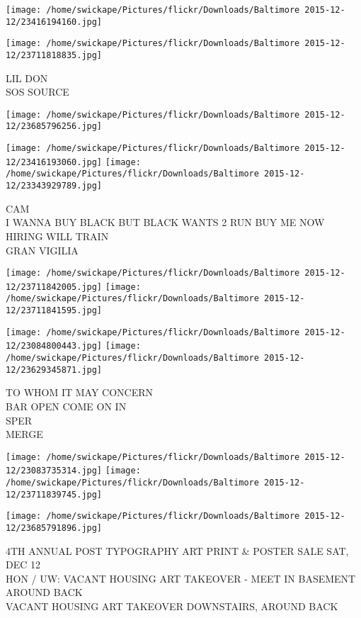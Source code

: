 \documentclass[10pt,letterpaper]{article}
\begin{document}
\texttt{[image: /home/swickape/Pictures/flickr/Downloads/Baltimore 2015-12-12/23416194160.jpg]}

\vspace{0.25in}
\texttt{[image: /home/swickape/Pictures/flickr/Downloads/Baltimore 2015-12-12/23711818835.jpg]}

LIL DON\\
SOS SOURCE
\pagebreak

\texttt{[image: /home/swickape/Pictures/flickr/Downloads/Baltimore 2015-12-12/23685796256.jpg]}

\vspace{0.25in}
\texttt{[image: /home/swickape/Pictures/flickr/Downloads/Baltimore 2015-12-12/23416193060.jpg]}
\texttt{[image: /home/swickape/Pictures/flickr/Downloads/Baltimore 2015-12-12/23343929789.jpg]}

CAM\\
I WANNA BUY BLACK BUT BLACK WANTS 2 RUN BUY ME NOW HIRING WILL TRAIN\\
GRAN VIGILIA
\pagebreak

\texttt{[image: /home/swickape/Pictures/flickr/Downloads/Baltimore 2015-12-12/23711842005.jpg]}
\texttt{[image: /home/swickape/Pictures/flickr/Downloads/Baltimore 2015-12-12/23711841595.jpg]}

\texttt{[image: /home/swickape/Pictures/flickr/Downloads/Baltimore 2015-12-12/23084800443.jpg]}
\texttt{[image: /home/swickape/Pictures/flickr/Downloads/Baltimore 2015-12-12/23629345871.jpg]}

TO WHOM IT MAY CONCERN\\
BAR OPEN COME ON IN\\
SPER\\
MERGE
\pagebreak

\texttt{[image: /home/swickape/Pictures/flickr/Downloads/Baltimore 2015-12-12/23083735314.jpg]}
\texttt{[image: /home/swickape/Pictures/flickr/Downloads/Baltimore 2015-12-12/23711839745.jpg]}

\vspace{0.25in}
\texttt{[image: /home/swickape/Pictures/flickr/Downloads/Baltimore 2015-12-12/23685791896.jpg]}

4TH ANNUAL POST TYPOGRAPHY ART PRINT \& POSTER SALE SAT, DEC 12\\
HON / UW: VACANT HOUSING ART TAKEOVER {-} MEET IN BASEMENT AROUND BACK\\
VACANT HOUSING ART TAKEOVER DOWNSTAIRS, AROUND BACK
\pagebreak
\end{document}
